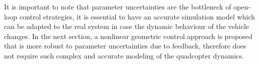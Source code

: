 It is important to note that parameter uncertainties are the bottleneck of open-loop control strategies, it is essential to have an accurate simulation model which can be adapted to the real system in case the dynamic behaviour of the vehicle changes. In the next section, a nonlinear geometric control approach is proposed that is more robust to parameter uncertainties due to feedback, therefore does not require such complex and accurate modeling of the quadcopter dynamics.

